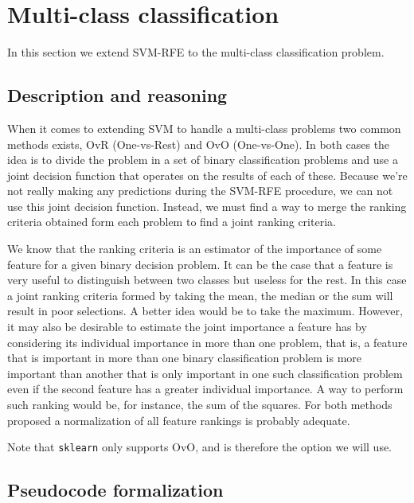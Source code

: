 \chapter{Multi-class classification} %


In this section we extend SVM-RFE to the multi-class classification problem.

\section{Description and reasoning}
\label{sec:stopCond.desc}

When it comes to extending SVM to handle a multi-class problems two common methods exists, OvR (One-vs-Rest) and OvO (One-vs-One). In both cases the idea is to divide the problem in a set of binary classification problems and use a joint decision function that operates on the results of each of these. Because we're not really making any predictions during the SVM-RFE procedure, we can not use this joint decision function. Instead, we must find a way to merge the ranking criteria obtained form each problem to find a joint ranking criteria.

We know that the ranking criteria is an estimator of the importance of some feature for a given binary decision problem. It can be the case that a feature is very useful to distinguish between two classes but useless for the rest. In this case a joint ranking criteria formed by taking the mean, the median or the sum will result in poor selections. A better idea would be to take the maximum. However, it may also be desirable to estimate the joint importance a feature has by considering its individual importance in more than one problem, that is, a feature that is important in more than one binary classification problem is more important than another that is only important in one such classification problem even if the second feature has a greater individual importance. A way to perform such ranking would be, for instance, the sum of the squares. For both methods proposed a normalization of all feature rankings is probably adequate.

Note that \texttt{sklearn} only supports OvO, and is therefore the option we will use.

\section{Pseudocode formalization}

